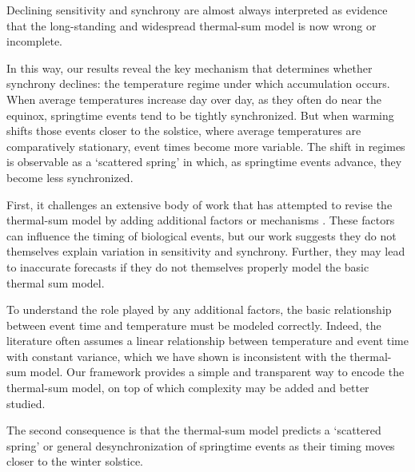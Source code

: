 
Declining sensitivity and synchrony are almost always interpreted as evidence that the long-standing and widespread thermal-sum model is now wrong or incomplete.

In this way, our results reveal the key mechanism that determines whether synchrony declines: the temperature regime under which accumulation occurs. When average temperatures increase day over day, as they often do near the equinox, springtime events tend to be tightly synchronized. But when warming shifts those events closer to the solstice, where average temperatures are comparatively stationary, event times become more variable. The shift in regimes is observable as a `scattered spring' in which, as springtime events advance, they become less synchronized. 

 First, it challenges an extensive body of work that has attempted to revise the thermal-sum model by adding additional factors or mechanisms \citep{fu2015declining,kovaleskipreprint}. These factors can influence the timing of biological events, but our work suggests they do not themselves explain variation in sensitivity and synchrony. Further, they may lead to inaccurate forecasts if they do not themselves properly model the basic thermal sum model. 

To understand the role played by any additional factors, the basic relationship between event time and temperature must be modeled correctly. Indeed, the literature often assumes a linear relationship between temperature and event time with constant variance, which we have shown is inconsistent with the thermal-sum model. Our framework provides a simple and transparent way to encode the thermal-sum model, on top of which complexity may be added and better studied.

The second consequence is that the thermal-sum model predicts a `scattered spring' or general desynchronization of springtime events as their timing moves closer to the winter solstice.